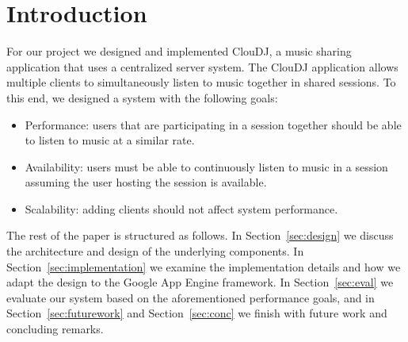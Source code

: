 \section{Introduction}
\label{sec:intro}
For our project we designed and implemented ClouDJ, 
a music sharing application that uses a centralized 
server system. The ClouDJ application allows multiple 
clients to simultaneously listen to music together 
in shared sessions. To this end, we designed a system 
with the following goals:
\begin{itemize}
  \item Performance: users that are participating in 
    a session together should be able to listen to music at a similar rate.
  \item Availability: users must be able to continuously 
    listen to music in a session assuming the user hosting 
    the session is available.
  \item Scalability: adding clients should not affect system performance.
\end{itemize}
The rest of the paper is structured as follows. In Section~\ref{sec:design}
we discuss the architecture and design of the underlying components. 
In Section~\ref{sec:implementation} we examine the implementation details
and how we adapt the design to the Google App Engine framework. In 
Section~\ref{sec:eval} we evaluate our system based on the aforementioned
performance goals, and in Section~\ref{sec:futurework} and Section~\ref{sec:conc}
we finish with future work and concluding remarks.